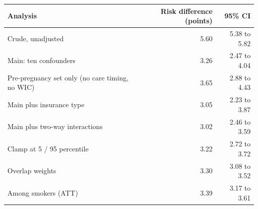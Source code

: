 {\small
\begin{tabular}{lrr}
\toprule
Analysis & Risk difference (points) & 95\% CI \\
\midrule
Crude, unadjusted & 5.60 & 5.38 to 5.82 \\
Main: ten confounders & 3.26 & 2.47 to 4.04 \\
Pre-pregnancy set only (no care timing, no WIC) & 3.65 & 2.88 to 4.43 \\
Main plus insurance type & 3.05 & 2.23 to 3.87 \\
Main plus two-way interactions & 3.02 & 2.46 to 3.59 \\
Clamp at 5 / 95 percentile & 3.22 & 2.72 to 3.72 \\
Overlap weights & 3.30 & 3.08 to 3.52 \\
Among smokers (ATT) & 3.39 & 3.17 to 3.61 \\
\bottomrule
\end{tabular}
}
